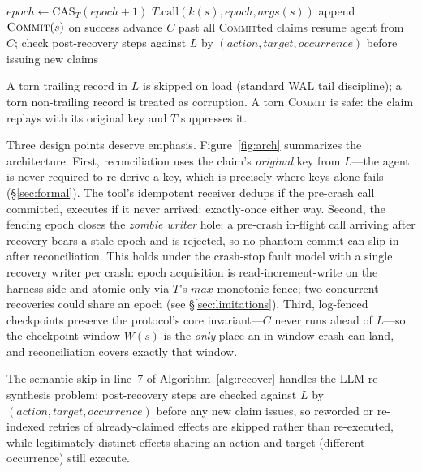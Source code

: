 \documentclass[10pt,journal,compsoc]{IEEEtran}
\begin{document}
\begin{algorithm}[t]
\caption{Reconciliation-first recovery}
\label{alg:recover}
\begin{algorithmic}[1]
\STATE $\mathit{epoch} \gets \mathrm{CAS}_{T}(\mathit{epoch}+1)$
\STATE $T.\mathrm{call}(k(s), \mathit{epoch},
\mathit{args}(s))$ 
\STATE append $\textsc{Commit}(s)$ on success
\ENDFOR
\STATE advance $C$ past all \textsc{Commit}ted claims
\STATE resume agent from $C$; check post-recovery steps
against $L$ by $(\mathit{action}, \mathit{target},
\mathit{occurrence})$ before
issuing new claims 
\end{algorithmic}
\end{algorithm}

A torn trailing record in $L$ is skipped on load (standard WAL tail
discipline); a torn non-trailing record is treated as corruption. A torn
\textsc{Commit} is safe: the claim replays with its original key and $T$
suppresses it.

Three design points deserve emphasis. Figure~\ref{fig:arch}
summarizes the architecture. First, reconciliation uses
the claim's \emph{original} key from $L$---the agent is never
required to re-derive a key, which is precisely where keys-alone
fails (\S\ref{sec:formal}). The tool's idempotent receiver
dedups if the pre-crash call committed, executes if it never
arrived: exactly-once either way. Second, the fencing epoch
closes the \emph{zombie writer} hole: a pre-crash in-flight call
arriving after recovery bears a stale epoch and is rejected, so
no phantom commit can slip in after reconciliation. This holds under the
crash-stop fault model with a single recovery writer per crash: epoch
acquisition is read-increment-write on the harness side and atomic only
via $T$'s $\mathit{max}$-monotonic fence; two concurrent recoveries could
share an epoch (see \S\ref{sec:limitations}). Third,
log-fenced checkpoints preserve the protocol's core
invariant---$C$ never runs ahead of $L$---so the checkpoint
window $W(s)$ is the \emph{only} place an in-window crash can
land, and reconciliation covers exactly that window.

The semantic skip in line~7 of Algorithm~\ref{alg:recover}
handles the LLM re-synthesis problem: post-recovery steps are
checked against $L$ by $(\mathit{action}, \mathit{target},
\mathit{occurrence})$ before any new claim issues, so reworded
or re-indexed retries of already-claimed effects are skipped
rather than re-executed, while legitimately distinct effects
sharing an action and target (different occurrence) still
execute.
\end{document}
